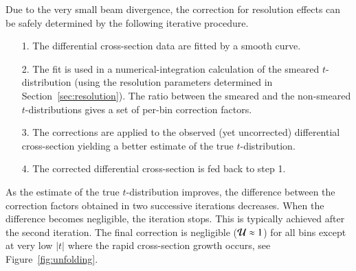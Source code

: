 Due to the very small beam divergence, the correction for resolution effects can be safely determined by the following iterative procedure.
\begin{itemize}
\item[1.] The differential cross-section data are fitted by a smooth curve.
\item[2.] The fit is used in a numerical-integration calculation of the smeared $t$-distribution (using the resolution parameters determined in Section~\ref{sec:resolution}). The ratio between the smeared and the non-smeared $t$-distributions gives a set of per-bin correction factors.
\item[3.] The corrections are applied to the observed (yet uncorrected) differential cross-section yielding a better estimate of the true $t$-distribution.
\item[4.] The corrected differential cross-section is fed back to step 1.
\end{itemize}
As the estimate of the true $t$-distribution improves, the difference between the correction factors obtained in two successive iterations decreases. When the difference becomes negligible, the iteration stops. This is typically achieved after the second iteration. The final correction is negligible (${\cal U} \approx 1$) for all bins except at very low $|t|$ where the rapid cross-section growth occurs, see Figure~\ref{fig:unfolding}.

